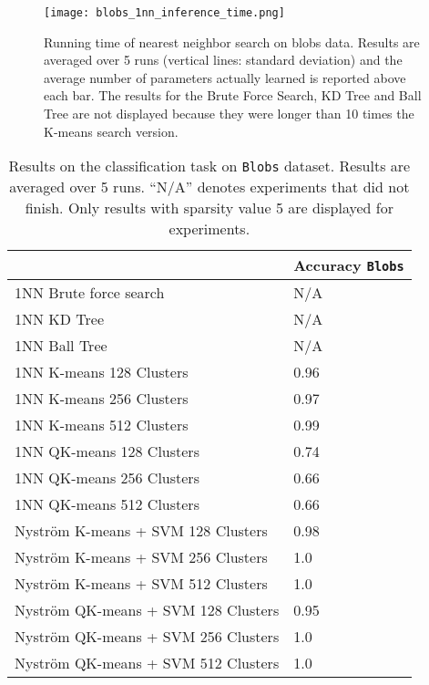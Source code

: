 \begin{figure}[tbh]
\centering
\texttt{[image: blobs\_1nn\_inference\_time.png]}
\label{fig:nn:blobs:times}

\caption{Running time of nearest neighbor search on blobs data. Results are averaged over 5 runs (vertical lines: standard deviation) and the average number of parameters actually learned is reported above each bar. The results for the Brute Force Search, KD Tree and Ball Tree are not displayed because they were longer than 10 times the K-means search version.}
\label{fig:nn:blobs}
\end{figure}

 
\begin{table}[]

\centering
\begin{tabular}{@{}l|P{2.5cm}}
\toprule
                                    & Accuracy \texttt{Blobs} \\ \midrule
1NN Brute force search              & N/A   \\
1NN KD Tree                         & N/A   \\
1NN Ball Tree                       & N/A   \\ \midrule \midrule
1NN K-means 128 Clusters            & 0.96      \\
1NN K-means 256 Clusters            & 0.97      \\
1NN K-means 512 Clusters            & 0.99      \\ \midrule
1NN QK-means 128 Clusters           & 0.74     \\
1NN QK-means 256 Clusters           & 0.66      \\
1NN QK-means 512 Clusters           & 0.66      \\ \midrule \midrule
Nyström K-means + SVM 128 Clusters  & 0.98      \\
Nyström K-means + SVM 256 Clusters  & 1.0      \\
Nyström K-means + SVM 512 Clusters  & 1.0      \\ \midrule
Nyström QK-means + SVM 128 Clusters & 0.95      \\
Nyström QK-means + SVM 256 Clusters & 1.0      \\
Nyström QK-means + SVM 512 Clusters & 1.0      \\ \bottomrule
\end{tabular}

\caption{Results on the classification task on \texttt{Blobs} dataset. Results are averaged over 5 runs. ``N/A'' denotes experiments that did not finish. Only results with sparsity value 5 are displayed for \qkmeans experiments.}
\label{table:results_blobs}

\end{table}

